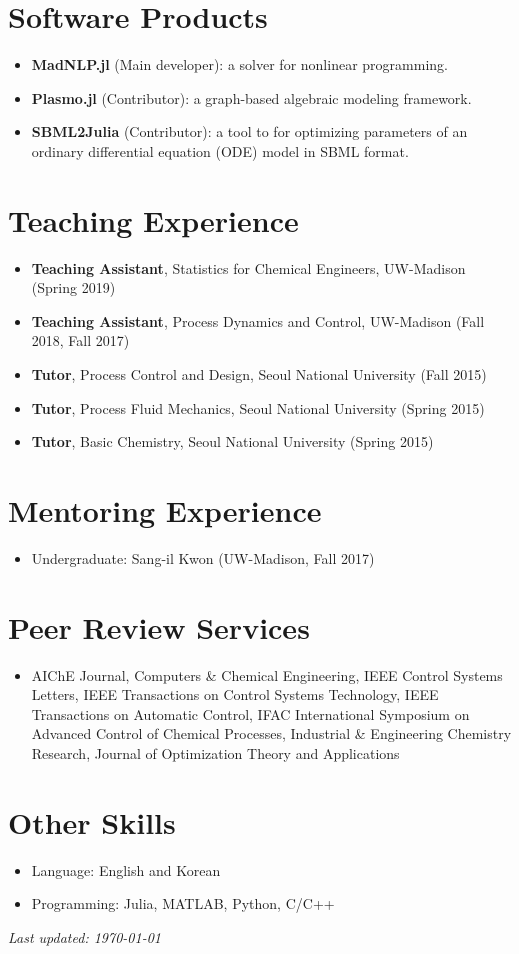 \documentclass{article}
\begin{document}
\section*{Software Products}
\begin{itemize}[leftmargin=*]
\item[] {\bf MadNLP.jl} (Main developer): a solver for nonlinear programming.
\item[] {\bf Plasmo.jl} (Contributor): a graph-based algebraic modeling framework.
\item[] {\bf SBML2Julia} (Contributor): a tool to for optimizing parameters of an ordinary differential equation (ODE) model in SBML format.
\end{itemize}

\section*{Teaching Experience}
\begin{itemize}[leftmargin=*]
\item[] {\bf Teaching Assistant}, Statistics for Chemical Engineers, UW-Madison (Spring 2019)
\item[] {\bf Teaching Assistant}, Process Dynamics and Control, UW-Madison (Fall 2018, Fall 2017)
\item[] {\bf Tutor}, Process Control and Design, Seoul National University (Fall 2015)
\item[] {\bf Tutor}, Process Fluid Mechanics, Seoul National University (Spring 2015)
\item[] {\bf Tutor}, Basic Chemistry, Seoul National University (Spring 2015)
\end{itemize}

\section*{Mentoring Experience}
\begin{itemize}[leftmargin=*]
\item[] Undergraduate: Sang-il Kwon (UW-Madison, Fall 2017)
\end{itemize}

\section*{Peer Review Services}
\begin{itemize}[leftmargin=*]
\item[] AIChE Journal, Computers \& Chemical Engineering, IEEE Control Systems Letters, IEEE Transactions on Control Systems Technology, IEEE Transactions on Automatic Control, IFAC International Symposium on Advanced Control of Chemical Processes, Industrial \& Engineering Chemistry Research, Journal of Optimization Theory and Applications
\end{itemize}

\section*{Other Skills}
\begin{itemize}[leftmargin=*]
\item[] Language: English and Korean
\item[] Programming: Julia, MATLAB, Python, C/C++
\end{itemize}

{\noindent\it Last updated: \today}
\end{document}
